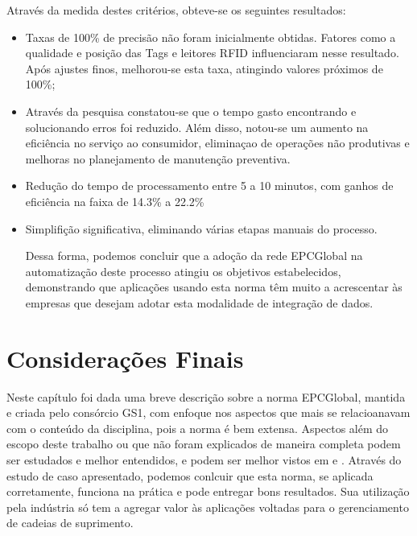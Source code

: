 \documentclass[a4paper,12pt,titlepage]{article}
\begin{document}
	Através da medida destes critérios, obteve-se os seguintes resultados:
	\begin{itemize}
		\item Taxas de 100\% de precisão não foram inicialmente obtidas. Fatores como a qualidade e posição das Tags e leitores RFID influenciaram nesse resultado. Após ajustes finos, melhorou-se esta taxa, atingindo valores próximos de 100\%;
		\item Através da pesquisa constatou-se que o tempo gasto encontrando e solucionando erros foi reduzido. Além disso, notou-se um aumento na eficiência no serviço ao consumidor, eliminaçao de operações não produtivas e melhoras no planejamento de manutenção preventiva.
		\item Redução do tempo de processamento entre 5 a 10 minutos, com ganhos de eficiência na faixa de 14.3\% a 22.2\% 
		\item Simplifição significativa, eliminando várias etapas manuais do processo.
		
	Dessa forma, podemos concluir que a adoção da rede EPCGlobal na automatização deste processo atingiu os objetivos estabelecidos, demonstrando que aplicações usando esta norma têm muito a acrescentar às empresas que desejam adotar esta modalidade de integração de dados.
		
	\end{itemize} 
	
	
	\section{Considerações Finais}
	Neste capítulo foi dada uma breve descrição sobre a norma EPCGlobal, mantida e criada pelo consórcio GS1, com enfoque nos aspectos que mais se relacioanavam com o conteúdo da disciplina, pois a norma é bem extensa. Aspectos além do escopo deste trabalho ou que não foram explicados de maneira completa podem ser estudados e melhor entendidos, e podem ser melhor vistos em \cite{gs1} e \cite{gs1arc}. Através do estudo de caso apresentado, podemos conlcuir que esta norma, se aplicada corretamente, funciona na prática e pode entregar bons resultados. Sua utilização pela indústria só tem a agregar valor às aplicações voltadas para o gerenciamento de cadeias de suprimento.
	
\newpage


\nocite{*}


		
\end{document}
